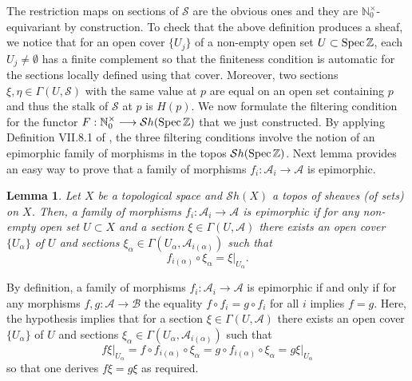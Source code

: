 \documentclass[noams,lp]{compositio}
\newtheorem{lem}[thm]{Lemma}
\def\Spec{{\rm Spec\,}}
\def\N{{\mathbb N}}
\def\Z{{\mathbb Z}}
\def\cS{{\mathcal S}}
\def\spz{{\Spec\Z}}
\def\nto{\N_0^{\times}}
\begin{document}
The restriction maps on sections of $\cS$ are the obvious ones and they are $\nto$-equivariant by construction. To check that the above definition produces a sheaf, we notice that for an open cover $\{U_j\}$ of a non-empty open set $U\subset\spz$, each $U_j\neq\emptyset$ has a finite complement so that the finiteness condition is automatic for the sections locally defined using that cover. Moreover, two sections $\xi, \eta\in\Gamma(U,\cS)$ with the same value at $p$ are equal on an open set containing $p$ and thus the stalk of $\cS$ at $p$ is $H(p)$.\newline
We now formulate the filtering condition for the functor $F:\nto\longrightarrow {\mathcal Sh}(\Spec\Z)$ that we just constructed. By applying Definition VII.8.1 of \cite{MM}, the three filtering conditions involve the notion of an epimorphic family of morphisms in the topos ${\mathcal Sh}(\Spec\Z)$.
Next lemma provides an easy way to prove that a  family of morphisms $f_i:\mathcal A_i\to \mathcal A$ is epimorphic.

\begin{lem}
Let $X$ be a topological space and ${\mathcal Sh}(X)$ a topos of sheaves (of sets) on $X$. Then, a  family of morphisms $f_i: \mathcal A_i\to \mathcal A$ is epimorphic if for any non-empty open set $U\subset X$ and a section $\xi\in \Gamma(U, \mathcal A)$ there exists an open cover $\{U_\alpha\}$ of $U$ and sections $\xi_\alpha\in \Gamma(U_\alpha, \mathcal A_{i(\alpha)})$ such that 
$$
f_{i(\alpha)}\circ \xi_\alpha=\xi\vert_{U_\alpha}.
$$
\end{lem}
\proof By definition, a  family of morphisms $f_i: \mathcal A_i\to \mathcal A$ is epimorphic if and only if for any morphisms $f,g: \mathcal A\to \mathcal B$ the equality $f\circ f_i=g\circ f_i$ for all $i$ implies $f=g$. Here, the hypothesis implies that for a section $\xi\in \Gamma(U, \mathcal A)$ there exists an open cover $\{U_\alpha\}$ of $U$ and sections $\xi_\alpha\in \Gamma(U_\alpha, \mathcal A_{i(\alpha)})$ such that
$$
f\xi\vert_{U_\alpha}=f\circ f_{i(\alpha)}\circ \xi_\alpha=g\circ  f_{i(\alpha)}\circ \xi_\alpha=g\xi\vert_{U_\alpha}
$$
so that one derives $f\xi=g\xi$ as required.\endproof
\end{document}
